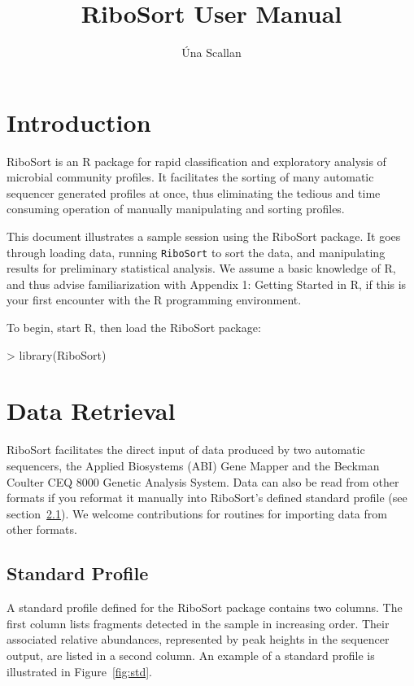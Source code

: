 \documentclass[a4paper]{article}
\title{RiboSort User Manual}
\author{\'{U}na Scallan}
\begin{document}
\maketitle

\section {Introduction}

RiboSort is an R package for rapid classification and exploratory analysis of microbial community profiles. It facilitates the sorting of many automatic sequencer generated profiles at once, thus eliminating the tedious and time consuming operation of manually manipulating and sorting profiles. 

This document illustrates a sample session using the RiboSort package. It goes through loading data, running \texttt{RiboSort} to sort the data, and manipulating results for preliminary statistical analysis. We assume a basic  knowledge of R, and thus advise familiarization with Appendix 1: Getting Started in R, if this is your first encounter with the R programming environment.

To begin, start R, then load the RiboSort package:

\begin{Schunk}
\begin{Sinput}
> library(RiboSort)
\end{Sinput}
\end{Schunk}
\section{Data Retrieval}

RiboSort facilitates the direct input of data produced by two automatic sequencers, the Applied Biosystems (ABI) Gene Mapper and the Beckman Coulter CEQ 8000 Genetic Analysis System. Data can also be read from other formats if you reformat it manually into RiboSort's defined standard profile (see section~\ref{sec:std}). We welcome contributions for routines for importing data from other formats.

\subsection{\textbf{Standard Profile}}
\label{sec:std}
A standard profile defined for the RiboSort package contains two columns. The first column lists fragments detected in the sample in increasing order. Their associated relative abundances, represented by peak heights in the sequencer output, are listed in a second column. An example of a standard profile is illustrated in Figure~\ref{fig:std}.
\end{document}
